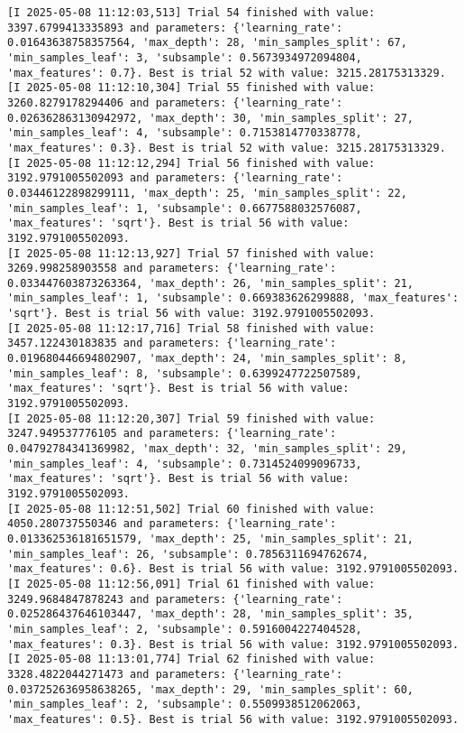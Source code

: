 \documentclass[
  letterpaper,
  DIV=11,
  numbers=noendperiod]{scrreprt}
\begin{document}
\begin{verbatim}
[I 2025-05-08 11:12:03,513] Trial 54 finished with value: 3397.6799413335893 and parameters: {'learning_rate': 0.01643638758357564, 'max_depth': 28, 'min_samples_split': 67, 'min_samples_leaf': 3, 'subsample': 0.5673934972094804, 'max_features': 0.7}. Best is trial 52 with value: 3215.28175313329.
[I 2025-05-08 11:12:10,304] Trial 55 finished with value: 3260.8279178294406 and parameters: {'learning_rate': 0.026362863130942972, 'max_depth': 30, 'min_samples_split': 27, 'min_samples_leaf': 4, 'subsample': 0.7153814770338778, 'max_features': 0.3}. Best is trial 52 with value: 3215.28175313329.
[I 2025-05-08 11:12:12,294] Trial 56 finished with value: 3192.9791005502093 and parameters: {'learning_rate': 0.03446122898299111, 'max_depth': 25, 'min_samples_split': 22, 'min_samples_leaf': 1, 'subsample': 0.6677588032576087, 'max_features': 'sqrt'}. Best is trial 56 with value: 3192.9791005502093.
[I 2025-05-08 11:12:13,927] Trial 57 finished with value: 3269.998258903558 and parameters: {'learning_rate': 0.033447603873263364, 'max_depth': 26, 'min_samples_split': 21, 'min_samples_leaf': 1, 'subsample': 0.669383626299888, 'max_features': 'sqrt'}. Best is trial 56 with value: 3192.9791005502093.
[I 2025-05-08 11:12:17,716] Trial 58 finished with value: 3457.122430183835 and parameters: {'learning_rate': 0.019680446694802907, 'max_depth': 24, 'min_samples_split': 8, 'min_samples_leaf': 8, 'subsample': 0.6399247722507589, 'max_features': 'sqrt'}. Best is trial 56 with value: 3192.9791005502093.
[I 2025-05-08 11:12:20,307] Trial 59 finished with value: 3247.949537776105 and parameters: {'learning_rate': 0.04792784341369982, 'max_depth': 32, 'min_samples_split': 29, 'min_samples_leaf': 4, 'subsample': 0.7314524099096733, 'max_features': 'sqrt'}. Best is trial 56 with value: 3192.9791005502093.
[I 2025-05-08 11:12:51,502] Trial 60 finished with value: 4050.280737550346 and parameters: {'learning_rate': 0.013362536181651579, 'max_depth': 25, 'min_samples_split': 21, 'min_samples_leaf': 26, 'subsample': 0.7856311694762674, 'max_features': 0.6}. Best is trial 56 with value: 3192.9791005502093.
[I 2025-05-08 11:12:56,091] Trial 61 finished with value: 3249.9684847878243 and parameters: {'learning_rate': 0.025286437646103447, 'max_depth': 28, 'min_samples_split': 35, 'min_samples_leaf': 2, 'subsample': 0.5916004227404528, 'max_features': 0.3}. Best is trial 56 with value: 3192.9791005502093.
[I 2025-05-08 11:13:01,774] Trial 62 finished with value: 3328.4822044271473 and parameters: {'learning_rate': 0.037252636958638265, 'max_depth': 29, 'min_samples_split': 60, 'min_samples_leaf': 2, 'subsample': 0.5509938512062063, 'max_features': 0.5}. Best is trial 56 with value: 3192.9791005502093.

\end{verbatim}
\end{document}
